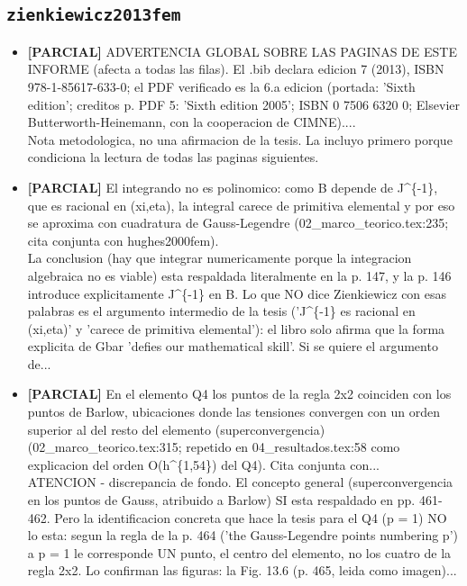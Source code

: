 \documentclass[11pt,a4paper]{article}
\newcommand{\campo}[1]{\textcolor{gris}{\footnotesize #1}}
\begin{document}
\subsection{\texttt{zienkiewicz2013fem}}
\begin{itemize}\small
\item \textbf{[PARCIAL]} ADVERTENCIA GLOBAL SOBRE LAS PAGINAS DE ESTE INFORME (afecta a todas las filas). El .bib declara edicion 7 (2013), ISBN 978-1-85617-633-0; el PDF verificado es la 6.a edicion (portada: 'Sixth edition'; creditos p. PDF 5: 'Sixth edition 2005'; ISBN 0 7506 6320 0; Elsevier Butterworth-Heinemann, con la cooperacion de CIMNE)....
\\ \campo{Nota metodologica, no una afirmacion de la tesis. La incluyo primero porque condiciona la lectura de todas las paginas siguientes.}
\item \textbf{[PARCIAL]} \textquotedbl{}El integrando no es polinomico: como B depende de J\textasciicircum{}\{-1\}, que es racional en (xi,eta), la integral carece de primitiva elemental\textquotedbl{} y por eso se aproxima con cuadratura de Gauss-Legendre (02\_marco\_teorico.tex:235; cita conjunta con hughes2000fem).
\\ \campo{La conclusion (hay que integrar numericamente porque la integracion algebraica no es viable) esta respaldada literalmente en la p. 147, y la p. 146 introduce explicitamente J\textasciicircum{}\{-1\} en B. Lo que NO dice Zienkiewicz con esas palabras es el argumento intermedio de la tesis ('J\textasciicircum{}\{-1\} es racional en (xi,eta)' y 'carece de primitiva elemental'): el libro solo afirma que la forma explicita de Gbar 'defies our mathematical skill'. Si se quiere el argumento de...}
\item \textbf{[PARCIAL]} \textquotedbl{}En el elemento Q4 los puntos de la regla 2x2 coinciden con los puntos de Barlow, ubicaciones donde las tensiones convergen con un orden superior al del resto del elemento (superconvergencia)\textquotedbl{} (02\_marco\_teorico.tex:315; repetido en 04\_resultados.tex:58 como explicacion del orden O(h\textasciicircum{}\{1,54\}) del Q4). Cita conjunta con...
\\ \campo{ATENCION - discrepancia de fondo. El concepto general (superconvergencia en los puntos de Gauss, atribuido a Barlow) SI esta respaldado en pp. 461-462. Pero la identificacion concreta que hace la tesis para el Q4 (p = 1) NO lo esta: segun la regla de la p. 464 ('the Gauss-Legendre points numbering p') a p = 1 le corresponde UN punto, el centro del elemento, no los cuatro de la regla 2x2. Lo confirman las figuras: la Fig. 13.6 (p. 465, leida como imagen)...}

\end{itemize}
\end{document}
